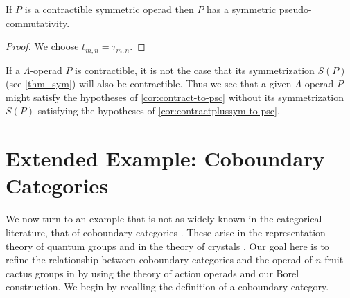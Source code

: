 \begin{cor}\label{cor:contractplussym-to-psc}
If $P$ is a contractible symmetric operad then $\underline{P}$ has a symmetric pseudo-commutativity.
\end{cor}
\begin{proof}
We choose $t_{m,n} = \tau_{m,n}$.
\end{proof}

\begin{rem}\label{rem:symm-and-contract}
If a $\Lambda$-operad $P$ is contractible, it is not the case that its symmetrization $S(P)$ (see \cref{thm_sym}) will also be contractible.
Thus we see that a given $\Lambda$-operad $P$ might satisfy the hypotheses of \cref{cor:contract-to-psc} without its symmetrization $S(P)$ satisfying the hypotheses of \cref{cor:contractplussym-to-psc}.

\end{rem}



\section{Extended Example: Coboundary Categories}\label{sec:exex-cactus}


We now turn to an example that is not as widely known in the categorical literature, that of coboundary categories \cite{drin-quasihopf}. These arise in the representation theory of quantum groups and in the theory of crystals \cite{hk-cobound, hk-quantum}. Our goal here is to refine the relationship between coboundary categories and the operad of $n$-fruit cactus groups in \cite{hk-cobound} by using the theory of action operads and our Borel construction. We begin by recalling the definition of a coboundary category.



